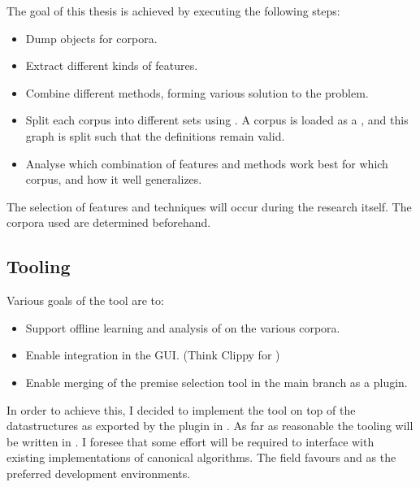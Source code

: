 The goal of this thesis is achieved by executing the following steps:
\begin{itemize}
    \item Dump \coq objects for corpora.
    \item Extract different kinds of features.
    \item Combine different \machinelearning methods, forming various solution to the \premiseselection problem.
    \item Split each corpus into different sets using \crossvalidation.
        A corpus is loaded as a \dagraph, and this graph is split such that the definitions remain valid.
    \item Analyse which combination of features and \machinelearning methods work best for which corpus, and how it well generalizes.
\end{itemize}

The selection of features and \machinelearning techniques will occur during the research itself.
The corpora used are determined beforehand.

\subsection{Tooling}
Various goals of the \premiseselection tool are to:
\begin{itemize}
    \item Support offline learning and analysis of \machinelearning on the various corpora.
    \item Enable integration in the \coqide GUI. (Think Clippy for \coq)
    \item Enable merging of the premise selection tool in the \coq main branch as a plugin.
\end{itemize}
In order to achieve this, I decided to implement the tool on top of the \acic datastructures
as exported by the \xml plugin in \coq.
As far as reasonable the \premiseselection tooling will be written in \ocaml.
I foresee that some effort will be required to interface \ocaml with existing implementations
of canonical \machinelearning algorithms.
The \machinelearning field favours \python and \matlab as the preferred development environments.

